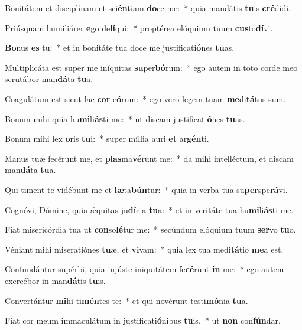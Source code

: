 \item Bonitátem et disciplínam et sci\textbf{én}tiam \textbf{do}ce me:~* quia mandátis \textbf{tu}is \textbf{cré}didi.
\item Priúsquam humiliárer \textbf{e}go de\textbf{lí}qui:~* proptérea elóquium tuum \textbf{cus}to\textbf{dí}vi.
\item \textbf{Bo}nus \textbf{es} tu:~* et in bonitáte tua doce me justificati\textbf{ó}nes \textbf{tu}as.
\item Multiplicáta est super me iníquitas \textbf{su}per\textbf{bó}rum:~* ego autem in toto corde meo scrutábor man\textbf{dá}ta \textbf{tu}a.
\item Coagulátum est sicut lac \textbf{cor} e\textbf{ó}rum:~* ego vero legem tuam \textbf{me}di\textbf{tá}tus sum.
\item Bonum mihi quia hu\textbf{mi}li\textbf{ás}ti me:~* ut discam justificati\textbf{ó}nes \textbf{tu}as.
\item Bonum mihi lex \textbf{o}ris \textbf{tu}i:~* super míllia auri \textbf{et} ar\textbf{gén}ti.
\item Manus tuæ fecérunt me, et \textbf{plas}ma\textbf{vé}runt me:~* da mihi intelléctum, et discam man\textbf{dá}ta \textbf{tu}a.
\item Qui timent te vidébunt me et \textbf{læ}ta\textbf{bún}tur:~* quia in verba tua su\textbf{per}spe\textbf{rá}vi.
\item Cognóvi, Dómine, quia ǽquitas ju\textbf{dí}cia \textbf{tu}a:~* et in veritáte tua hu\textbf{mi}li\textbf{ás}ti me.
\item Fiat misericórdia tua ut \textbf{con}so\textbf{lé}tur me:~* secúndum elóquium tuum \textbf{ser}vo \textbf{tu}o.
\item Véniant mihi miseratiónes \textbf{tu}æ, et \textbf{vi}vam:~* quia lex tua medi\textbf{tá}tio \textbf{me}a est.
\item Confundántur supérbi, quia injúste iniquitátem fe\textbf{cé}runt \textbf{in} me:~* ego autem exercébor in man\textbf{dá}tis \textbf{tu}is.
\item Convertántur \textbf{mi}hi ti\textbf{mén}tes te:~* et qui novérunt testi\textbf{mó}nia \textbf{tu}a.
\item Fiat cor meum immaculátum in justificati\textbf{ó}nibus \textbf{tu}is,~* ut \textbf{non} con\textbf{fún}dar.
